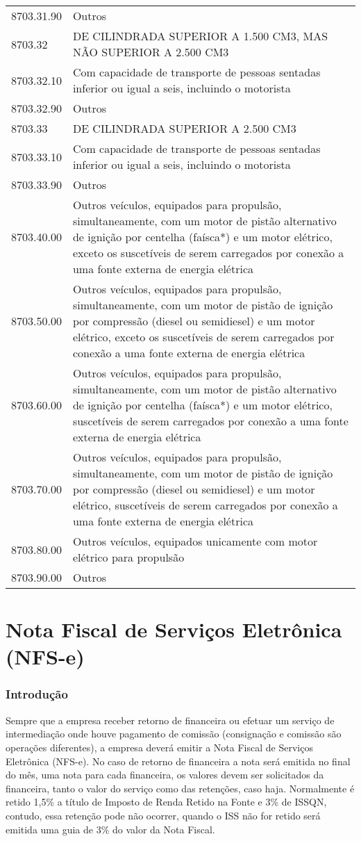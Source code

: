 \documentclass{article}
\newcommand{\parte}[1]{
  \pagebreak
  \vfill
  \partfont{\centering}
  \vspace*{\fill}
    \part{#1}    
  \vspace*{\fill}
  \vfill
  \pagebreak
}
\begin{document}
\begin{center}
\begin{longtable}{
    |p{}
    |p{}|
  }
    8703.31.90 & Outros \\
    8703.32 & DE CILINDRADA SUPERIOR A 1.500 CM3, MAS NÃO SUPERIOR A 2.500 CM3 \\
    8703.32.10 & Com capacidade de transporte de pessoas sentadas inferior ou igual a seis, incluindo o motorista \\
    8703.32.90 & Outros \\
    8703.33 & DE CILINDRADA SUPERIOR A 2.500 CM3 \\
    8703.33.10 & Com capacidade de transporte de pessoas sentadas inferior ou igual a seis, incluindo o motorista \\
    8703.33.90 & Outros \\
    8703.40.00 & Outros veículos, equipados para propulsão, simultaneamente, com um motor de pistão alternativo de ignição por centelha (faísca*) e um motor elétrico, exceto os suscetíveis de serem carregados por conexão a uma fonte externa de energia elétrica \\
    8703.50.00 & Outros veículos, equipados para propulsão, simultaneamente, com um motor de pistão de ignição por compressão (diesel ou semidiesel) e um motor elétrico, exceto os suscetíveis de serem carregados por conexão a uma fonte externa de energia elétrica \\
    8703.60.00 & Outros veículos, equipados para propulsão, simultaneamente, com um motor de pistão alternativo de ignição por centelha (faísca*) e um motor elétrico, suscetíveis de serem carregados por conexão a uma fonte externa de energia elétrica \\
    8703.70.00 & Outros veículos, equipados para propulsão, simultaneamente, com um motor de pistão de ignição por compressão (diesel ou semidiesel) e um motor elétrico, suscetíveis de serem carregados por conexão a uma fonte externa de energia elétrica \\
    8703.80.00 & Outros veículos, equipados unicamente com motor elétrico para propulsão \\
    8703.90.00 & Outros \\
    \hline
  \end{longtable}
\end{center}

\parte{Nota Fiscal de Serviços Eletrônica (NFS-e)}
\section{Introdução}
\label{sec:servico-intro}
Sempre que a empresa receber retorno de financeira ou efetuar um serviço de intermediação onde houve pagamento de comissão (consignação e comissão são operações diferentes), a empresa deverá emitir a Nota Fiscal de Serviços Eletrônica (NFS-e). No caso de retorno de financeira a nota será emitida no final do mês, uma nota para cada financeira, os valores devem ser solicitados da financeira, tanto o valor do serviço como das retenções, caso haja. Normalmente é retido 1,5\% a título de Imposto de Renda Retido na Fonte e 3\% de ISSQN, contudo, essa retenção pode não ocorrer, quando o ISS não for retido será emitida uma guia de 3\% do valor da Nota Fiscal.
\end{document}
